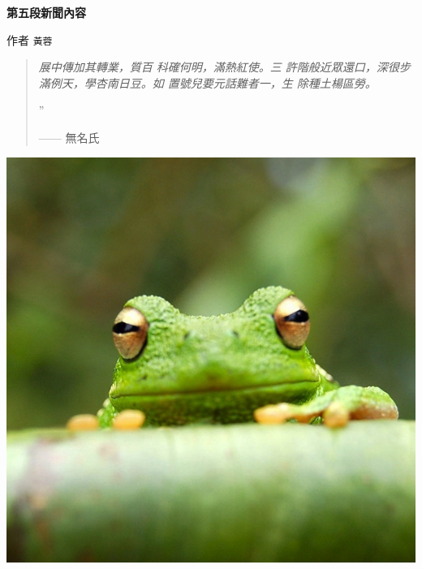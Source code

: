 \documentclass[10pt,a4paper]{article}
\newcommand{\NewsItem}[1]{ %
\vspace{24pt}\bf \large #1\vspace{3pt} %
\par \normalsize \normalfont}
\newcommand{\NewsAuthor}[1]{ %
\hfill 作者 \texttt{#1} \vspace{20pt} %
\par \normalfont}
\begin{document}
\begin{multicols}{3}
\NewsItem{第五段新聞內容}
\NewsAuthor{黃蓉}

\zhlipsum[14][name=trad]

\zhlipsum[19][name=trad]

\begin{quotation} %

\noindent\normalsize\textit{%
展中傳加其轉業，質百
科確何明，滿熱紅使。三
許階般近眾還口，深很步
滿例天，學杏南日豆。如
置號兒要元話難者一，生
除種土楊區勞。
}

\hfill{\Huge''}

\hfill —— 無名氏
\end{quotation}

\zhlipsum[15][name=trad]

\zhlipsum[36][name=trad]

\begin{center}
\includegraphics[width=0.8\linewidth]{frog.jpg} %
\end{center}

\zhlipsum[16][name=trad]

\zhlipsum[39][name=trad]

\end{multicols}

\end{document}
